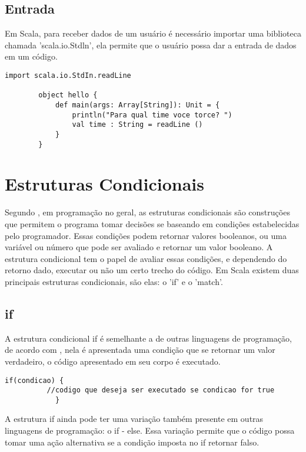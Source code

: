 	\subsection{Entrada}
	
	Em Scala, para receber dados de um usu\'{a}rio \'{e} necess\'{a}rio importar uma biblioteca chamada 'scala.io.Stdln', ela permite que o usu\'{a}rio possa dar a entrada de dados em um c\'{o}digo.
	
	\begin{lstlisting}[breaklines]
		import scala.io.StdIn.readLine
		
		object hello {
			def main(args: Array[String]): Unit = {
				println("Para qual time voce torce? ")
				val time : String = readLine ()
			}
		}
	\end{lstlisting}

	\section{Estruturas Condicionais}
	
	Segundo \cite{Wampler2021}, em programa\c{c}\~{a}o no geral, as estruturas condicionais s\~{a}o construções que permitem o programa tomar decis\~{o}es se baseando em condi\c{c}\~{o}es estabelecidas pelo programador. Essas condi\c{c}\~{o}es podem retornar valores booleanos, ou uma vari\'{a}vel ou n\'{u}mero que pode ser avaliado e retornar um valor booleano. A estrutura condicional tem o papel de avaliar essas condi\c{c}\~{o}es, e dependendo do retorno dado, executar ou não um certo trecho do c\'{o}digo. Em Scala existem duas principais estruturas condicionais, s\~{a}o elas: o 'if' e o 'match'.
	
	\subsection{if}
	A estrutura condicional if \'{e} semelhante a de outras linguagens de programa\c{c}\~{a}o, de acordo com \cite{Sfregola2021}, nela \'{e} apresentada uma condi\c{c}\~{a}o que se retornar um valor verdadeiro, o c\'{o}digo apresentado em seu corpo \'{e} executado.
	
	\begin{lstlisting}[breaklines]
		if(condicao) {
		  //codigo que deseja ser executado se condicao for true	
	        }   
	\end{lstlisting}
	
	A estrutura if ainda pode ter uma variação tamb\'{e}m presente em outras linguagens de programa\c{c}\~{a}o: o if - else. Essa variação permite que o c\'{o}digo possa tomar uma ação alternativa se a condi\c{c}\~{a}o imposta no if retornar falso.
	
